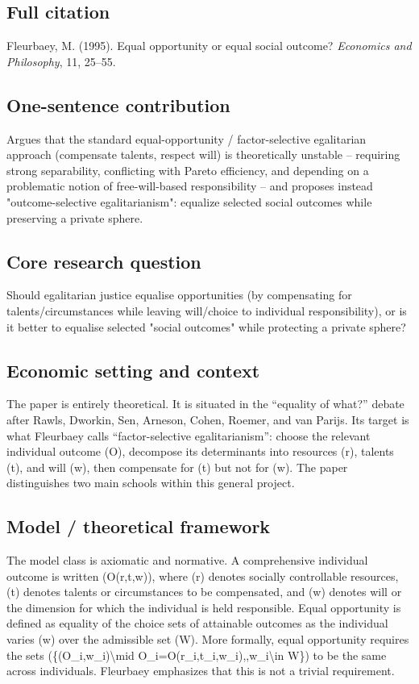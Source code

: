 \documentclass[11pt,a4paper]{article}
\begin{document}
\subsection*{Full citation}
Fleurbaey, M. (1995). Equal opportunity or equal social outcome? \textit{Economics and Philosophy}, 11, 25--55.

\subsection*{One-sentence contribution}
Argues that the standard equal-opportunity / factor-selective egalitarian approach (compensate talents, respect will) is theoretically unstable -- requiring strong separability, conflicting with Pareto efficiency, and depending on a problematic notion of free-will-based responsibility -- and proposes instead "outcome-selective egalitarianism": equalize selected social outcomes while preserving a private sphere.

\subsection*{Core research question}
Should egalitarian justice equalise opportunities (by compensating for talents/circumstances while leaving will/choice to individual responsibility), or is it better to equalise selected "social outcomes" while protecting a private sphere?

\subsection*{Economic setting and context}
The paper is entirely theoretical. It is situated in the “equality of what?” debate after Rawls, Dworkin, Sen, Arneson, Cohen, Roemer, and van Parijs. Its target is what Fleurbaey calls “factor-selective egalitarianism”: choose the relevant individual outcome (O), decompose its determinants into resources (r), talents (t), and will (w), then compensate for (t) but not for (w). The paper distinguishes two main schools within this general project.

\subsection*{Model / theoretical framework}
The model class is axiomatic and normative. A comprehensive individual outcome is written (O(r,t,w)), where (r) denotes socially controllable resources, (t) denotes talents or circumstances to be compensated, and (w) denotes will or the dimension for which the individual is held responsible. Equal opportunity is defined as equality of the choice sets of attainable outcomes as the individual varies (w) over the admissible set (W). More formally, equal opportunity requires the sets (\{(O\_i,w\_i)\textbackslash{}mid O\_i=O(r\_i,t\_i,w\_i),,w\_i\textbackslash{}in W\}) to be the same across individuals. Fleurbaey emphasizes that this is not a trivial requirement.
\end{document}
